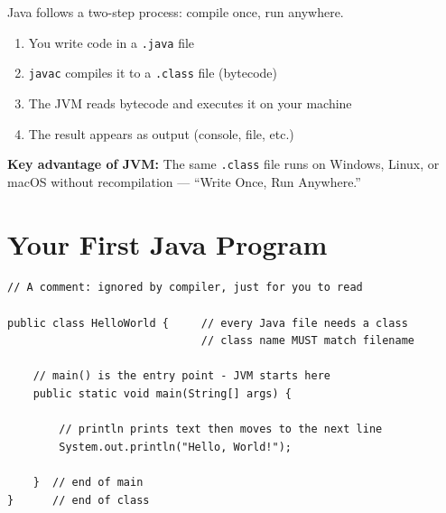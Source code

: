 \documentclass[12pt,a4paper,oneside]{book}
\begin{document}
Java follows a two-step process: compile once, run anywhere.

\begin{center}
\end{center}

\begin{enumerate}
  \item You write code in a \texttt{.java} file
  \item \texttt{javac} compiles it to a \texttt{.class} file (bytecode)
  \item The JVM reads bytecode and executes it on your machine
  \item The result appears as output (console, file, etc.)
\end{enumerate}

\textbf{Key advantage of JVM:} The same \texttt{.class} file runs on Windows, Linux, or macOS without recompilation --- ``Write Once, Run Anywhere.''

\section{Your First Java Program}

\begin{lstlisting}[caption={Hello World in Java --- Every line explained}]
// A comment: ignored by compiler, just for you to read

public class HelloWorld {     // every Java file needs a class
                              // class name MUST match filename

    // main() is the entry point - JVM starts here
    public static void main(String[] args) {

        // println prints text then moves to the next line
        System.out.println("Hello, World!");

    }  // end of main
}      // end of class
\end{lstlisting}
\end{document}
